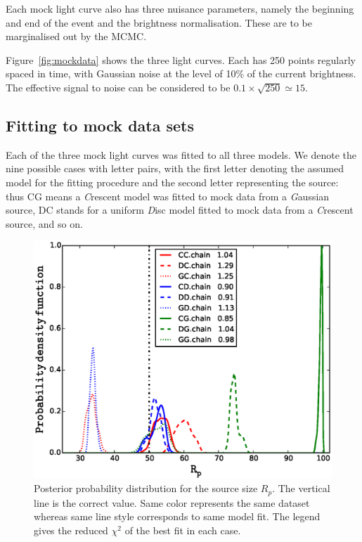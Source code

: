 Each mock light curve also has three nuisance parameters, namely the
beginning and end of the event and the brightness normalisation.
These are to be marginalised out by the MCMC.

Figure~\ref{fig:mockdata} shows the three light curves.  Each has 250
points regularly spaced in time, with Gaussian noise at the level of
10\% of the current brightness.  The effective signal to noise can be
considered to be $0.1\times\sqrt{250}\simeq15$.

\subsection{Fitting to mock data sets}

Each of the three mock light curves was fitted to all three models.
We denote the nine possible cases with letter pairs, with the first
letter denoting the assumed model for the fitting procedure and 
the second letter representing
the source: thus CG means a {\em C\/}rescent model was fitted to mock
data from a {\em G\/}aussian source, DC stands for a uniform {\em
  D\/}isc model fitted to mock data from a {\em C\/}rescent source,
and so on.

\begin{figure}
\centering
  \includegraphics[width=0.9\hsize,bb=0 0 576 432
                  ]{plots/Rp4all.eps}
\caption{\label{fig:mcmc} Posterior probability distribution for the
  source size $R_p$.  The vertical line is the correct value. Same
  color represents the same dataset whereas same line style
  corresponds to same model fit.  The legend gives the reduced
  $\chi^2$ of the best fit in each case.}
\end{figure}

